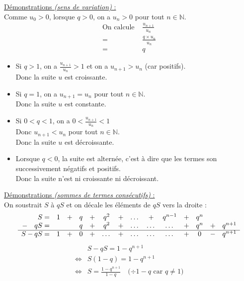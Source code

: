 \documentclass[11pt,a4paper]{article}
\begin{document}
\underline{Démonstrations \emph{(sens de variation)} :} \\

Comme $u_0>0$, lorsque $q>0$, on a $u_n>0$ pour tout $n\in\mathbb{N}$.
\begin{equation*}
  \begin{split}
    \text{On calcule }& \frac{u_{n+1}}{u_n} \\
    = \text{ }& \frac{q\times u_n}{u_n} \\
    = \text{ }& q
  \end{split}
\end{equation*}

\begin{itemize}
  \item Si $q>1$, on a $\frac{u_{n+1}}{u_n}>1$ et on a $u_{n+1}>u_n$ (car positifs). \\
        Donc la suite $u$ est croissante.
  \item Si $q=1$, on a $u_{n+1}=u_n$ pour tout $n\in\mathbb{N}$. \\
        Donc la suite $u$ est constante.
  \item Si $0<q<1$, on a $0<\frac{u_{n+1}}{u_n}<1$ \\
        Donc $u_{n+1}<u_n$ pour tout $n\in\mathbb{N}$. \\
        Donc la suite $u$ est décroissante.
  \item Lorsque $q<0$, la suite est alternée, c'est à dire que les termes son successivement négatifs et positifs. \\
        Donc la suite n'est ni croissante ni décroissant.
\end{itemize}


\underline{Démonstrations \emph{(sommes de termes consécutifs)} :} \\

On soustrait $S$ à $qS$ et on décale les éléments de $qS$ vers la droite :
\begin{equation*}
  \begin{array}{r c c c c c c c c c c c c c c}
    S=         & 1 & + & q & + & q^2   & + & \dots & +     & q^{n-1} & + & q^n &   &         \\
    -\quad qS= &   &   & q & + & q^2   & + & \dots & \dots & \dots   & + & q^n & + & q^{n+1} \\
    \cline{1-14}
    S-qS=      & 1 & + & 0 & + & \dots & + & \dots & \dots & \dots   & + & 0   & - & q^{n+1} \\
  \end{array}
\end{equation*}
\vspace{-12pt}
\begin{equation*}
  \renewcommand{\arraystretch}{2}
  \begin{array}{ll}
                    & S-qS=    1-q^{n+1}                                                          \\
    \Leftrightarrow & S(1-q)=  1-q^{n+1}                                                          \\
    \Leftrightarrow & \displaystyle S=\frac{1-q^{n+1}}{1-q} \quad\text{($\div1-q$ car $q\not=1$)}
  \end{array}
\end{equation*}
\end{document}

